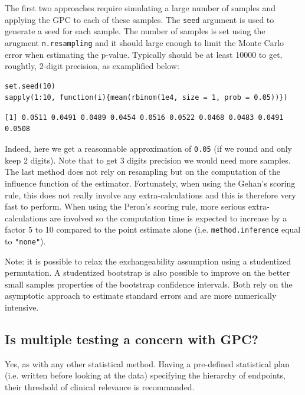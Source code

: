 \documentclass[12pt]{article}
\begin{document}
The first two approaches require simulating a large number of samples
and applying the GPC to each of these samples. The \texttt{seed} argument is
used to generate a seed for each sample. The number of samples is set
using the arugment \texttt{n.resampling} and it should large enough to limit
the Monte Carlo error when estimating the p-value. Typically should be
at least 10000 to get, roughtly, 2-digit precision, as examplified
below:
\lstset{language=r,label= ,caption= ,captionpos=b,numbers=none}
\begin{lstlisting}
set.seed(10)
sapply(1:10, function(i){mean(rbinom(1e4, size = 1, prob = 0.05))})
\end{lstlisting}

\begin{verbatim}
[1] 0.0511 0.0491 0.0489 0.0454 0.0516 0.0522 0.0468 0.0483 0.0491 0.0508
\end{verbatim}

Indeed, here we get a reasonnable approximation of \texttt{0.05} (if we round
and only keep 2 digits). Note that to get 3 digits precision we would
need more samples. The last method does not rely on resampling but on
the computation of the influence function of the
estimator. Fortunately, when using the Gehan's scoring rule, this does
not really involve any extra-calculations and this is therefore very
fast to perform. When using the Peron's scoring rule, more serious
extra-calculations are involved so the computation time is expected to
increase by a factor 5 to 10 compared to the point estimate alone
(i.e. \texttt{method.inference} equal to \texttt{"none"}).

\bigskip

Note: it is possible to relax the exchangeability assumption using a
studentized permutation. A studentized bootstrap is also possible to
improve on the better small samples properties of the bootstrap
confidence intervals. Both rely on the asymptotic approach to estimate
standard errors and are more numerically intensive.

\clearpage

\subsection{Is multiple testing a concern with GPC?}
\label{sec:org127d9b8}

Yes, as with any other statistical method. Having a pre-defined
statistical plan (i.e. written before looking at the data) specifying
the hierarchy of endpoints, their threshold of clinical relevance is
recommanded. 
\end{document}
